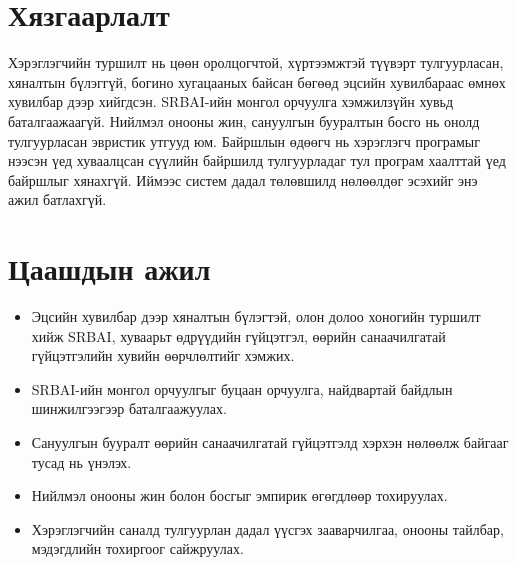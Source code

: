 \section*{Хязгаарлалт}

Хэрэглэгчийн туршилт нь цөөн оролцогчтой, хүртээмжтэй түүвэрт тулгуурласан, хяналтын бүлэггүй, богино хугацааных байсан бөгөөд эцсийн хувилбараас өмнөх хувилбар дээр хийгдсэн. SRBAI-ийн монгол орчуулга хэмжилзүйн хувьд баталгаажаагүй. Нийлмэл онооны жин, сануулгын бууралтын босго нь онолд тулгуурласан эвристик утгууд юм. Байршлын өдөөгч нь хэрэглэгч програмыг нээсэн үед хуваалцсан сүүлийн байршилд тулгуурладаг тул програм хаалттай үед байршлыг хянахгүй. Иймээс систем дадал төлөвшилд нөлөөлдөг эсэхийг энэ ажил батлахгүй.

\section*{Цаашдын ажил}

\begin{itemize}
    \item Эцсийн хувилбар дээр хяналтын бүлэгтэй, олон долоо хоногийн туршилт хийж SRBAI, хуваарьт өдрүүдийн гүйцэтгэл, өөрийн санаачилгатай гүйцэтгэлийн хувийн өөрчлөлтийг хэмжих.
    \item SRBAI-ийн монгол орчуулгыг буцаан орчуулга, найдвартай байдлын шинжилгээгээр баталгаажуулах.
    \item Сануулгын бууралт өөрийн санаачилгатай гүйцэтгэлд хэрхэн нөлөөлж байгааг тусад нь үнэлэх.
    \item Нийлмэл онооны жин болон босгыг эмпирик өгөгдлөөр тохируулах.
    \item Хэрэглэгчийн саналд тулгуурлан дадал үүсгэх зааварчилгаа, онооны тайлбар, мэдэгдлийн тохиргоог сайжруулах.
\end{itemize}
